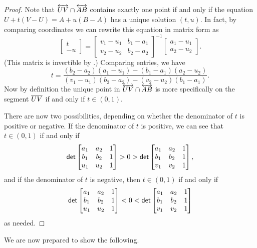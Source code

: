 \begin{proof}
Note that \(\overleftrightarrow{UV} \cap \overleftrightarrow{AB}\) contains exactly one point if and only if the equation \(U + t(V-U) = A + u(B-A)\) has a unique solution \((t,u)\).
In fact, by comparing coordinates we can rewrite this equation in matrix form as \[ \begin{bmatrix} t \\ -u \end{bmatrix} = \begin{bmatrix} v_1 - u_1 & b_1 - a_1 \\ v_2 - u_2 & b_2 - a_2 \end{bmatrix}^{-1} \begin{bmatrix} a_1 - u_1 \\ a_2 - u_2 \end{bmatrix}. \]
(This matrix is invertible by .) Comparing entries, we have \[ t = \frac{(b_2-a_2)(a_1-u_1) - (b_1-a_1)(a_2-u_2)}{(v_1-u_1)(b_2-a_2) - (v_2-u_2)(b_1-a_1)}. \]
Now by definition the unique point in \(\overleftrightarrow{UV} \cap \overleftrightarrow{AB}\) is more specifically on the segment \(\overline{UV}\) if and only if \(t \in (0,1)\).

There are now two possibilities, depending on whether the denominator of \(t\) is positive or negative.
If the denominator of \(t\) is positive, we can see that \(t \in (0,1)\) if and only if \[ \mathsf{det} \begin{bmatrix} a_1 & a_2 & 1 \\ b_1 & b_2 & 1 \\ u_1 & u_2 & 1 \end{bmatrix} > 0 > \mathsf{det} \begin{bmatrix} a_1 & a_2 & 1 \\ b_1 & b_2 & 1 \\ v_1 & v_2 & 1 \end{bmatrix}, \]
and if the denominator of \(t\) is negative, then \(t \in (0,1)\) if and only if \[ \mathsf{det} \begin{bmatrix} a_1 & a_2 & 1 \\ b_1 & b_2 & 1 \\ u_1 & u_2 & 1 \end{bmatrix} < 0 < \mathsf{det} \begin{bmatrix} a_1 & a_2 & 1 \\ b_1 & b_2 & 1 \\ v_1 & v_2 & 1 \end{bmatrix} \] as needed.
\end{proof}

We are now prepared to show the following.

